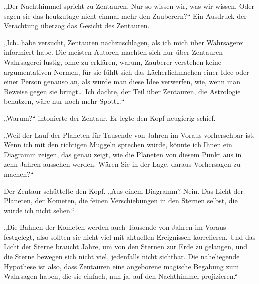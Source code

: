 „Der Nachthimmel spricht zu Zentauren. Nur so wissen wir, was wir wissen. Oder sagen sie das heutzutage nicht einmal mehr den Zauberern?“
Ein Ausdruck der Verachtung überzog das Gesicht des Zentauren.

„Ich…habe versucht, Zentauren nachzuschlagen, als ich mich über Wahrsagerei informiert habe. Die meisten Autoren machten sich nur über Zentauren-Wahrsagerei lustig, ohne zu erklären, warum, Zauberer verstehen keine argumentativen Normen, für sie fühlt sich das Lächerlichmachen einer Idee oder einer Person genauso an, als würde man diese Idee verwerfen, wie, wenn man Beweise gegen sie bringt… Ich dachte, der Teil über Zentauren, die Astrologie benutzen, wäre nur noch mehr Spott…“

„Warum?“ intonierte der Zentaur. Er legte den Kopf neugierig schief.

„Weil der Lauf der Planeten für Tausende von Jahren im Voraus vorhersehbar ist. Wenn ich mit den richtigen Muggeln sprechen würde, könnte ich Ihnen ein Diagramm zeigen, das genau zeigt, wie die Planeten von diesem Punkt aus in zehn Jahren aussehen werden. Wären Sie in der Lage, daraus Vorhersagen zu machen?“

Der Zentaur schüttelte den Kopf. „Aus einem Diagramm? Nein. Das Licht der Planeten, der Kometen, die feinen Verschiebungen in den Sternen selbst, die würde ich nicht sehen.“

„Die Bahnen der Kometen werden auch Tausende von Jahren im Voraus festgelegt, also sollten sie nicht viel mit aktuellen Ereignissen korrelieren. Und das Licht der Sterne braucht Jahre, um von den Sternen zur Erde zu gelangen, und die Sterne bewegen sich nicht viel, jedenfalls nicht sichtbar. Die naheliegende Hypothese ist also, dass Zentauren eine angeborene magische Begabung zum Wahrsagen haben, die sie einfach, nun ja, auf den Nachthimmel projizieren.“

